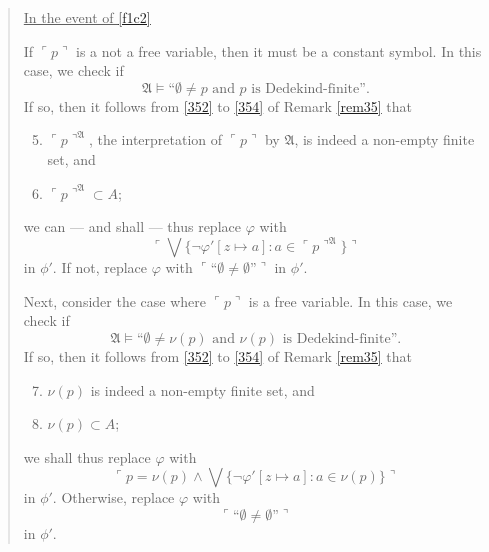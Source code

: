 \documentclass[12pt, twoside]{memoir}
\numberwithin{equation}{section}
\theoremstyle{definition}
\theoremstyle{remark}
\theoremstyle{definition}
\theoremstyle{definition}
\theoremstyle{definition}
\theoremstyle{remark}
\begin{document}
\begin{quote}
\begin{enumerate}[label=(\arabic*)]
\begin{enumerate}[label=(F\arabic*), leftmargin=30pt]
            \underline{In the event of \ref{f1c2}}
            
            If $\ulcorner p \urcorner$ is a not a free variable, then it must be a constant symbol. In this case, we check if 
            \begin{equation*}
                \mathfrak{A} \models \text{``}\emptyset \neq p \text{ and } p \text{ is Dedekind-finite''.}
            \end{equation*}
            If so, then it follows from \ref{352} to \ref{354} of Remark \ref{rem35} that 
            \begin{enumerate}[label=(\alph*)]
                \setcounter{enumiii}{4}
                \item $\ulcorner p \urcorner^{\mathfrak{A}}$, the interpretation of $\ulcorner p \urcorner$ by $\mathfrak{A}$, is indeed a non-empty finite set, and
                \item $\ulcorner p \urcorner^{\mathfrak{A}} \subset A$;
            \end{enumerate}
            we can --- and shall --- thus replace $\varphi$ with 
            \begin{equation*}
                \ulcorner \bigvee \{\neg \varphi'[z \mapsto a] : a \in \ulcorner p \urcorner^{\mathfrak{A}}\} \urcorner
            \end{equation*}
            in $\phi'$. If not, replace $\varphi$ with $\ulcorner \text{``} \emptyset \neq \emptyset \text{''} \urcorner$ in $\phi'$. 
        
            Next, consider the case where $\ulcorner p \urcorner$ is a free variable. In this case, we check if
            \begin{equation*}
                \mathfrak{A} \models \text{``}\emptyset \neq \nu(p) \text{ and } \nu(p) \text{ is Dedekind-finite''.}
            \end{equation*}
            If so, then it follows from \ref{352} to \ref{354} of Remark \ref{rem35} that 
            \begin{enumerate}[label=(\alph*)]
                \setcounter{enumiii}{6}
                \item $\nu(p)$ is indeed a non-empty finite set, and
                \item $\nu(p) \subset A$; 
            \end{enumerate}
            we shall thus replace $\varphi$ with
            \begin{equation*}
                \ulcorner p = \nu(p) \wedge \bigvee \{\neg \varphi'[z \mapsto a] : a \in \nu(p)\} \urcorner
            \end{equation*}
            in $\phi'$. Otherwise, replace $\varphi$ with 
            \begin{equation*}
                \ulcorner \text{``} \emptyset \neq \emptyset \text{''} \urcorner
            \end{equation*}
            in $\phi'$.
        \end{enumerate}
        

\end{enumerate}
\end{quote}
\end{document}
